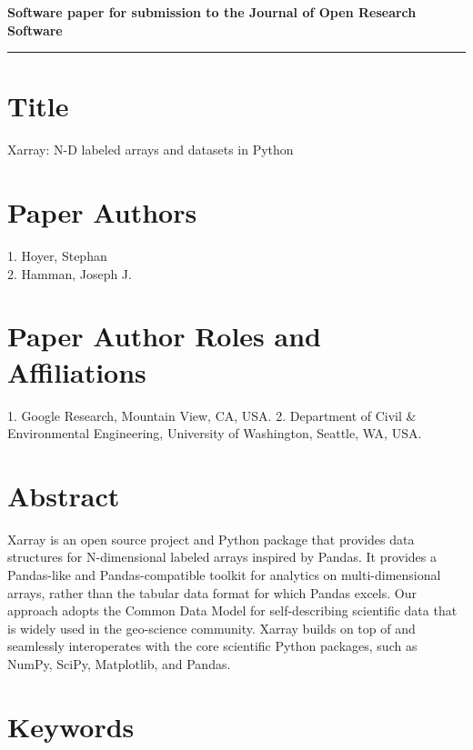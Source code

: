 \documentclass{jors}
\begin{document}
{\bf Software paper for submission to the Journal of Open Research Software} \\

%


\rule{\textwidth}{1pt}

\vspace{0.5cm}

\section*{Title}

Xarray: N-D labeled arrays and datasets in Python

\section*{Paper Authors}

{1. Hoyer, Stephan \\
 2. Hamman, Joseph J.}

\section*{Paper Author Roles and Affiliations}
{1. Google Research, Mountain View, CA, USA. 2. Department of Civil \& Environmental Engineering, University of Washington, Seattle, WA, USA.}

\section*{Abstract}

Xarray is an open source project and Python package that provides data structures for N-dimensional labeled arrays inspired by Pandas.
It provides a Pandas-like and Pandas-compatible toolkit for analytics on multi-dimensional arrays, rather than the tabular data format for which Pandas excels.
Our approach adopts the Common Data Model for self-describing scientific data that is widely used in the geo-science community.
Xarray builds on top of and seamlessly interoperates with the core scientific Python packages, such as NumPy, SciPy, Matplotlib, and Pandas.

\section*{Keywords}
\end{document}
